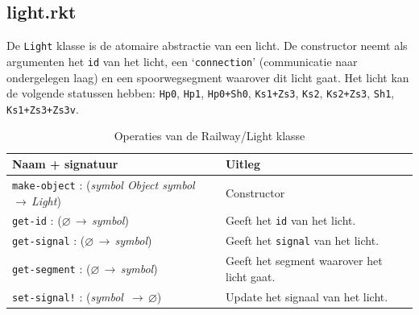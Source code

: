 \documentclass[a4paper, 11pt]{article}
\newcommand{\naar}{\,$\rightarrow$\,}
\renewcommand{\empty}{$\varnothing$}
\newcommand{\<}{\scriptsize\textless\normalsize}
\renewcommand{\>}{\scriptsize\textgreater\normalsize}
\begin{document}
\subsection{light.rkt} %
De \texttt{Light} klasse is de atomaire abstractie van een licht. De constructor neemt als argumenten het \texttt{id} van het licht, een \lq\texttt{connection}' (communicatie naar ondergelegen laag) en een spoorwegsegment waarover dit licht gaat. Het licht kan de volgende statussen hebben: \texttt{Hp0}, \texttt{Hp1}, \texttt{Hp0+Sh0}, \texttt{Ks1+Zs3}, \texttt{Ks2}, \texttt{Ks2+Zs3}, \texttt{Sh1}, \texttt{Ks1+Zs3+Zs3v}.
\begin{table}[H]
	\begin{center}
		{
		\begin{tabular}{|l l|}
			\hline
			\textbf{Naam + signatuur} & \textbf{Uitleg}\\
			\hline
			\texttt{make-object} : (\textit{symbol Object symbol} \naar \textit{Light}) & Constructor\\
			\hline
			\texttt{get-id} : (\empty \naar \textit{symbol}) & Geeft het \texttt{id} van het licht.\\
			\texttt{get-signal} : (\empty \naar \textit{symbol}) & Geeft het \texttt{signal} van het licht.\\
			\texttt{get-segment} : (\empty \naar \textit{symbol}) & Geeft het segment waarover het licht gaat.\\
			\texttt{set-signal!} : (\textit{symbol} \naar \empty) & Update het signaal van het licht.\\
			\hline
		\end{tabular}}
		\caption{Operaties van de Railway/Light klasse}
	\end{center}
\end{table}

\end{document}
